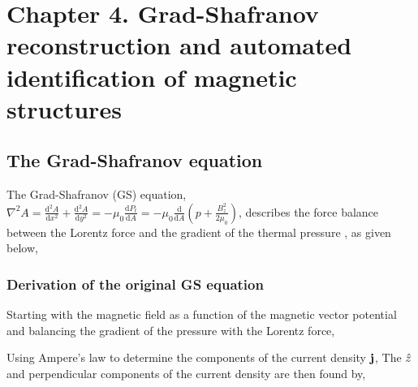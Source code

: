 \chapter{Chapter 4. Grad-Shafranov reconstruction and automated identification of magnetic structures} \label{ch:ch4}

\section{The Grad-Shafranov equation}
%
The Grad-Shafranov (GS) equation, $\nabla^2 A = \frac{\mathrm{d}^2 A}{\mathrm{d}x^2} + \frac{\mathrm{d}^2 A}{\mathrm{d}y^2} = -\mu_0 \frac{\mathrm{d}P_t}{\mathrm{d}A} = - \mu_0\frac{\mathrm{d}}{\mathrm{d}A}\left(p + \frac{B_z^2}{2\mu_0}\right)$, describes the force balance between the Lorentz force and the gradient of the thermal pressure \citep{Sonnerup:1996, Hau:1999}, as given below,

\subsection{Derivation of the original GS equation}
Starting with the magnetic field as a function of the magnetic vector potential and balancing the gradient of the pressure with the Lorentz force,

\noindent Using Ampere's law to determine the components of the current density $\mathbf{j}$,
The $\hat{z}$ and perpendicular components of the current density are then found by,

